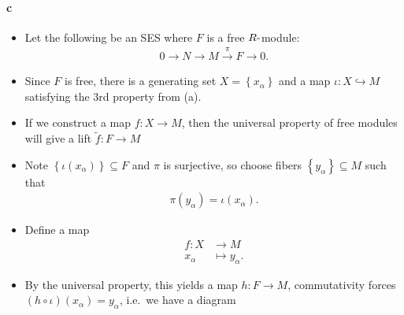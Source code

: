 \begin{solution}
{\paragraph{c}\label{c-54}}

\begin{itemize}
\item
  Let the following be an SES where \(F\) is a free
  \(R{\hbox{-}}\)module:
  \begin{align*}
  0 \to N \to M \xrightarrow{\pi} F \to 0
  .\end{align*}
\item
  Since \(F\) is free, there is a generating set
  \(X = \left\{{x_\alpha}\right\}\) and a map
  \(\iota:X\hookrightarrow M\) satisfying the 3rd property from (a).
\item
  If we construct a map \(f: X\to M\), then the universal property of
  free modules will give a lift \(\tilde f: F\to M\)
\item
  Note \(\left\{{\iota(x_\alpha)}\right\} \subseteq F\) and \(\pi\) is
  surjective, so choose fibers \(\left\{{y_\alpha}\right\} \subseteq M\)
  such that
  \begin{align*}\pi(y_\alpha) = \iota(x_\alpha).\end{align*}
\item
  Define a map
  \begin{align*}
  f: X&\to M \\
  x_\alpha &\mapsto y_\alpha
  .\end{align*}
\item
  By the universal property, this yields a map \(h: F\to M\),
  commutativity forces \((h\circ \iota)(x_\alpha) = y_\alpha\), i.e.~we
  have a diagram


\end{itemize}
\end{solution}
